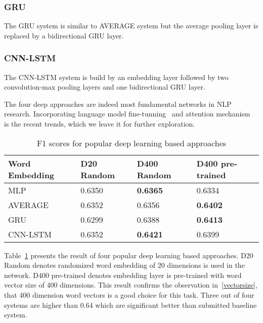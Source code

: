 \documentclass[11pt]{article}
\begin{document}
\subsubsection{GRU}  
The GRU system is similar to AVERAGE system but the average pooling layer is replaced by a bidirectional GRU layer.
\subsubsection{CNN-LSTM} 
The CNN-LSTM system is build by an embedding layer followed by two convolution-max pooling layers and one bidirectional GRU layer.

The four deep approaches are indeed most fundamental networks in NLP research. Incorporating language model fine-tunning~\cite{2018arXiv180106146H} and attention mechanism~\cite{Vaswani2017Attention} is the recent trends, which we leave it for further exploration.

\begin{table}[h]
	\centering
	
	
	\begin{tabular}{|l|l|l|l|}
		\hline
		Word Embedding & D20 Random & D400 Random & D400 pre-trained \\ \hline
		MLP & 0.6350 & \textbf{0.6365} & 0.6334 \\ \hline
		AVERAGE   & 0.6352      & 0.6356               & \textbf{0.6402}       \\ \hline
		GRU & 0.6299 & 0.6388 & \textbf{0.6413} \\ \hline
		CNN-LSTM & 0.6352 & \textbf{0.6421}  & 0.6399 \\ \hline
	\end{tabular}
	\caption{F1 scores for popular deep learning based approaches}
	\label{4deepnets}
\end{table}

Table~\ref{4deepnets} presents the result of four popular deep learning based approaches. D20 Random denotes randomized word embedding of 20 dimensions is used in the network. D400 pre-trained denotes embedding layer is pre-trained with word vector size of 400 dimensions. This result confirms the observation in~\ref{vectorsize}, that 400 dimension word vectors is a good choice for this task. Three out of four systems are higher than 0.64 which are significant better than submitted baseline system.
\end{document}
